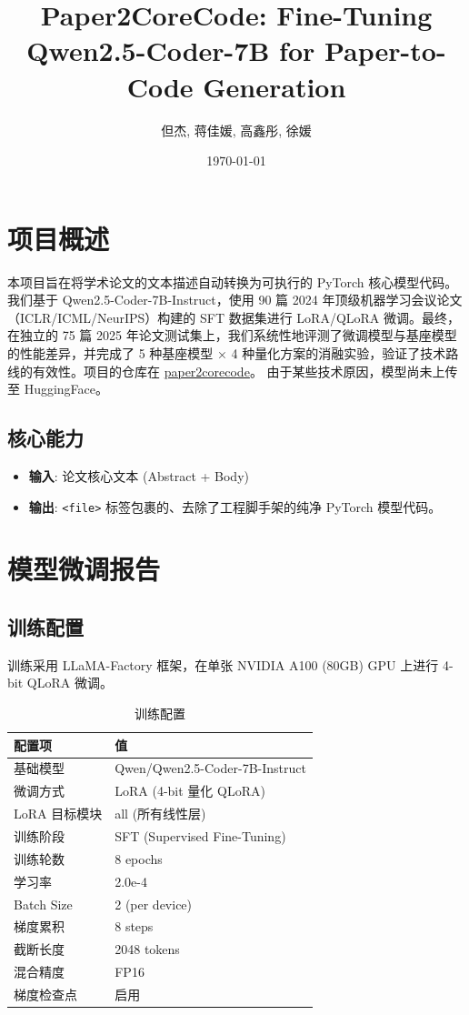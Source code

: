\documentclass[a4paper]{article}
\title{Paper2CoreCode: Fine-Tuning Qwen2.5-Coder-7B for Paper-to-Code Generation}
\author{但杰, 蒋佳媛, 高鑫彤, 徐媛}
\date{\today}
\begin{document}
\maketitle
\tableofcontents
\newpage

\section{项目概述}
本项目旨在将学术论文的文本描述自动转换为可执行的 PyTorch 核心模型代码。我们基于 Qwen2.5-Coder-7B-Instruct，使用 90 篇 2024 年顶级机器学习会议论文（ICLR/ICML/NeurIPS）构建的 SFT 数据集进行 LoRA/QLoRA 微调。最终，在独立的 75 篇 2025 年论文测试集上，我们系统性地评测了微调模型与基座模型的性能差异，并完成了 5 种基座模型 × 4 种量化方案的消融实验，验证了技术路线的有效性。项目的仓库在 \href{https://github.com/anyadanyuan/paper2corecode.git}{paper2corecode}。 由于某些技术原因，模型尚未上传至 HuggingFace。

\subsection{核心能力}
\begin{itemize}
    \item \textbf{输入}: 论文核心文本 (Abstract + Body)
    \item \textbf{输出}: \texttt{<file>} 标签包裹的、去除了工程脚手架的纯净 PyTorch 模型代码。
\end{itemize}

\section{模型微调报告}

\subsection{训练配置}
训练采用 LLaMA-Factory 框架，在单张 NVIDIA A100 (80GB) GPU 上进行 4-bit QLoRA 微调。

\begin{table}[h!]
\centering
\begin{tabularx}{\textwidth}{lX}
\toprule
\textbf{配置项} & \textbf{值} \\
\midrule
基础模型 & Qwen/Qwen2.5-Coder-7B-Instruct \\
微调方式 & LoRA (4-bit 量化 QLoRA) \\
LoRA 目标模块 & all (所有线性层) \\
训练阶段 & SFT (Supervised Fine-Tuning) \\
训练轮数 & 8 epochs \\
学习率 & 2.0e-4 \\
Batch Size & 2 (per device) \\
梯度累积 & 8 steps \\
截断长度 & 2048 tokens \\
混合精度 & FP16 \\
梯度检查点 & 启用 \\
\bottomrule
\end{tabularx}
\caption{训练配置}
\end{table}
\end{document}
